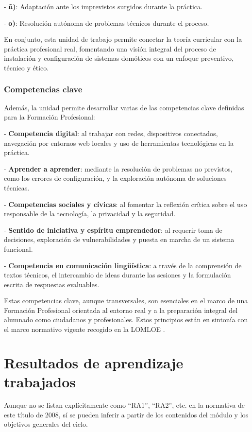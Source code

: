 - \textbf{ñ)}: Adaptación ante los imprevistos surgidos durante la práctica.

- \textbf{o)}: Resolución autónoma de problemas técnicos durante el proceso.

En conjunto, esta unidad de trabajo permite conectar la teoría curricular con la práctica profesional real, fomentando una visión integral del proceso de instalación y configuración de sistemas domóticos con un enfoque preventivo, técnico y ético.


\subsubsection{Competencias clave}

Además, la unidad permite desarrollar varias de las competencias clave definidas para la Formación Profesional:

- \textbf{Competencia digital}: al trabajar con redes, dispositivos conectados, navegación por entornos web locales y uso de herramientas tecnológicas en la práctica.

- \textbf{Aprender a aprender}: mediante la resolución de problemas no previstos, como los errores de configuración, y la exploración autónoma de soluciones técnicas.

- \textbf{Competencias sociales y cívicas}: al fomentar la reflexión crítica sobre el uso responsable de la tecnología, la privacidad y la seguridad.

- \textbf{Sentido de iniciativa y espíritu emprendedor}: al requerir toma de decisiones, exploración de vulnerabilidades y puesta en marcha de un sistema funcional.

- \textbf{Competencia en comunicación lingüística}: a través de la comprensión de textos técnicos, el intercambio de ideas durante las sesiones y la formulación escrita de respuestas evaluables.

Estas competencias clave, aunque transversales, son esenciales en el marco de una Formación Profesional orientada al entorno real y a la preparación integral del alumnado como ciudadanos y profesionales. Estos principios están en sintonía con el marco normativo vigente recogido en la LOMLOE \cite{LOMLOE2020}.


\section{Resultados de aprendizaje trabajados}
Aunque no se listan explícitamente como “RA1”, “RA2”, etc. en la normativa de este título de 2008, sí se pueden inferir a partir de los contenidos del módulo y los objetivos generales del ciclo.

